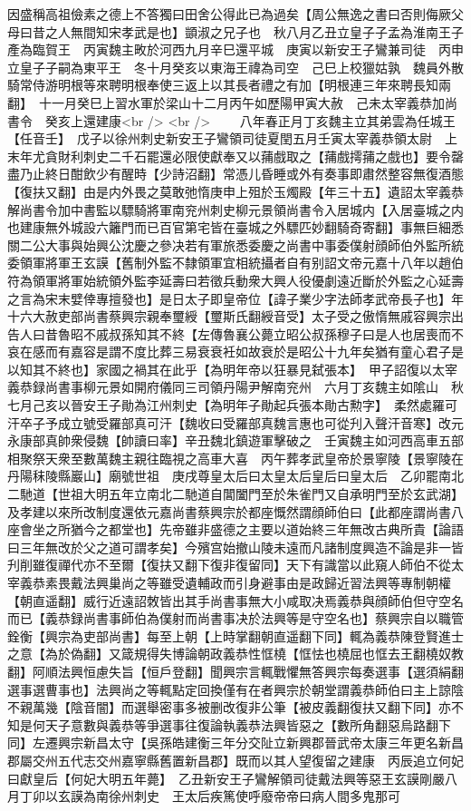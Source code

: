 因盛稱高祖儉素之德上不答獨曰田舍公得此已為過矣【周公無逸之書曰否則侮厥父母曰昔之人無間知宋孝武是也】顗淑之兄子也　秋八月乙丑立皇子子孟為淮南王子產為臨賀王　丙寅魏主畋於河西九月辛巳還平城　庚寅以新安王子鸞兼司徒　丙申立皇子子嗣為東平王　冬十月癸亥以東海王禕為司空　己巳上校獵姑孰　魏員外散騎常侍游明根等來聘明根奉使三返上以其長者禮之有加【明根連三年來聘長知兩翻】　十一月癸巳上習水軍於梁山十二月丙午如歷陽甲寅大赦　己未太宰義恭加尚書令　癸亥上還建康<br />
<br />
　　八年春正月丁亥魏主立其弟雲為任城王【任音壬】　戊子以徐州刺史新安王子鸞領司徒夏閏五月壬寅太宰義恭領太尉　上末年尤貪財利刺史二千石罷還必限使獻奉又以蒱戲取之【蒱戲摴蒱之戲也】要令罄盡乃止終日酣飲少有醒時【少詩沼翻】常憑儿昏睡或外有奏事即肅然整容無復酒態【復扶又翻】由是内外畏之莫敢弛惰庚申上殂於玉燭殿【年三十五】遺詔太宰義恭解尚書令加中書監以驃騎將軍南兖州刺史柳元景領尚書令入居城内【入居臺城之内也建康無外城設六籬門而已百官第宅皆在臺城之外驃匹妙翻騎奇寄翻】事無巨細悉關二公大事與始興公沈慶之參决若有軍旅悉委慶之尚書中事委僕射顔師伯外監所統委領軍將軍王玄謨【舊制外監不隸領軍宜相統攝者自有别詔文帝元嘉十八年以趙伯符為領軍將軍始統領外監李延壽曰若徵兵動衆大興人役優劇遠近斷於外監之心延壽之言為宋末嬖倖專擅發也】是日太子即皇帝位【諱子業少字法師孝武帝長子也】年十六大赦吏部尚書蔡興宗親奉璽綬【璽斯氏翻綬音受】太子受之傲惰無戚容興宗出告人曰昔魯昭不戚叔孫知其不終【左傳魯襄公薨立昭公叔孫穆子曰是人也居喪而不哀在感而有嘉容是謂不度比葬三易衰衰衽如故衰於是昭公十九年矣猶有童心君子是以知其不終也】家國之禍其在此乎【為明年帝以狂暴見弑張本】　甲子詔復以太宰義恭録尚書事柳元景如開府儀同三司領丹陽尹解南兖州　六月丁亥魏主如隂山　秋七月己亥以晉安王子勛為江州刺史【為明年子勛起兵張本勛古勲字】　柔然處羅可汗卒子予成立號受羅部真可汗【魏收曰受羅部真魏言惠也可從刋入聲汗音寒】改元永康部真帥衆侵魏【帥讀曰率】辛丑魏北鎮遊軍擊破之　壬寅魏主如河西高車五部相聚祭天衆至數萬魏主親往臨視之高車大喜　丙午葬孝武皇帝於景寧陵【景寧陵在丹陽秣陵縣巖山】廟號世祖　庚戌尊皇太后曰太皇太后皇后曰皇太后　乙卯罷南北二馳道【世祖大明五年立南北二馳道自閶闔門至於朱雀門又自承明門至於玄武湖】及孝建以來所改制度還依元嘉尚書蔡興宗於都座慨然謂顔師伯曰【此都座謂尚書八座會坐之所猶今之都堂也】先帝雖非盛德之主要以道始終三年無改古典所貴【論語曰三年無改於父之道可謂孝矣】今殯宫始撤山陵未遠而凡諸制度興造不論是非一皆刋削雖復禪代亦不至爾【復扶又翻下復非復留同】天下有識當以此窺人師伯不從太宰義恭素畏戴法興巢尚之等雖受遺輔政而引身避事由是政歸近習法興等專制朝權【朝直遥翻】威行近遠詔敇皆出其手尚書事無大小咸取决焉義恭與顔師伯但守空名而已【義恭録尚書事師伯為僕射而尚書事决於法興等是守空名也】蔡興宗自以職管銓衡【興宗為吏部尚書】每至上朝【上時掌翻朝直遥翻下同】輒為義恭陳登賢進士之意【為於偽翻】又箴規得失博論朝政義恭性恇橈【恇怯也橈屈也恇去王翻橈奴教翻】阿順法興恒慮失旨【恒戶登翻】聞興宗言輒戰懼無答興宗每奏選事【選須絹翻選事選曹事也】法興尚之等輒點定回換僅有在者興宗於朝堂謂義恭師伯曰主上諒陰不親萬幾【陰音闇】而選舉密事多被删改復非公筆【被皮義翻復扶又翻下同】亦不知是何天子意數與義恭等爭選事往復論執義恭法興皆惡之【數所角翻惡烏路翻下同】左遷興宗新昌太守【吳孫皓建衡三年分交阯立新興郡晉武帝太康三年更名新昌郡屬交州五代志交州嘉寧縣舊置新昌郡】既而以其人望復留之建康　丙辰追立何妃曰獻皇后【何妃大明五年薨】　乙丑新安王子鸞解領司徒戴法興等惡王玄謨剛嚴八月丁卯以玄謨為南徐州刺史　王太后疾篤使呼廢帝帝曰病人間多鬼那可